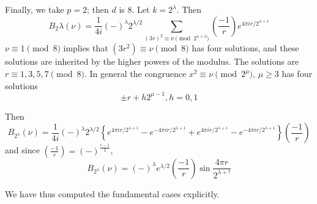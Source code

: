 Finally, we take $p=2$; then $d$ is 8. Let $k=2^\lambda$. Then
$$
B_2 \lambda (\nu) = \frac{1}{4i} (-)^\lambda 2^{\lambda/2}
\sum_{(3r)^2 \equiv \nu \pmod{2^{\lambda+3}}} \left(
\frac{-1}{r}\right) e^{4 \pi i r/ 2^{\lambda+1}}
$$
$\nu\equiv 1 \pmod{8}$ implies that $(3r^2) \equiv \nu \pmod{8}$ has
four solutions, and these solutions are inherited by the higher powers
of the modulus. The solutions are $r\equiv 1, 3, 5, 7 \pmod{8}$. In
general the congruence $x^2 \equiv \nu \pmod{2^\mu}$, $\mu
\geq 3$ has four solutions 
$$
\pm r + h 2^{\mu-1}, h=0, 1
$$

Then\pageoriginale
$$
B_{2^\lambda} (\nu) = \frac{1}{4i} (-)^\lambda 2^{\lambda/2} \left\{
e^{4 \pi i r/2^{\lambda+1}}- e^{-4 \pi ir/2^{\lambda+1}}+ e^{4 \pi i
  r/2^{\lambda+1}} - e^{- 4 \pi i r/2^{\lambda+1}}\right\} \left(
\frac{-1}{r}\right)  
$$
and since $\left( \frac{-1}{r}\right)= (-)^{\frac{r-1}{2}}$,
\begin{equation*}
  B_{2^\lambda} (\nu) = (-)^\lambda e^{\lambda/2} \left(
  \frac{-1}{r}\right) \sin \frac{4 \pi r}{2^{\lambda+!}}
  \tag{10}\label{part3:lec25:eq10}   
\end{equation*}

We have thus computed the fundamental cases explicitly.
